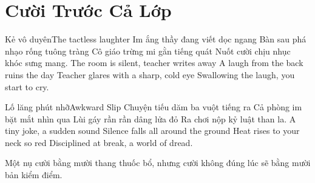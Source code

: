 \chapter{Cười Trước Cả Lớp}

\begin{tutuyetbox}{Kẻ vô duyên}{The tactless laughter}
Im ắng thầy đang viết dọc ngang
Bàn sau phá nhạo rống tuông tràng
Cô giáo trừng mi gằn tiếng quát
Nuốt cười chịu nhục khóc sưng mang.
\tcblower
The room is silent, teacher writes away 
A laugh from the back ruins the day 
Teacher glares with a sharp, cold eye 
Swallowing the laugh, you start to cry.
\end{tutuyetbox}

\begin{tutuyetbox}{Lố lăng phút nhỡ}{Awkward Slip}
Chuyện tiếu dăm ba vuột tiếng ra
Cả phòng im bặt mắt nhìn qua
Lùi gáy rần rần dâng lửa đỏ
Ra chơi nộp kỷ luật than la.
\tcblower
A tiny joke, a sudden sound 
Silence falls all around the ground 
Heat rises to your neck so red 
Disciplined at break, a world of dread.
\end{tutuyetbox}

\begin{ghichu}
Một nụ cười bằng mười thang thuốc bổ, nhưng cười không đúng lúc sẽ bằng mười bản kiểm điểm.
\end{ghichu}